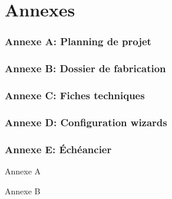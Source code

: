 \section*{Annexes}

\subsubsection*{Annexe A: Planning de projet}

\subsubsection*{Annexe B: Dossier de fabrication}

\subsubsection*{Annexe C: Fiches techniques}

\subsubsection*{Annexe D: Configuration wizards}

\subsubsection*{Annexe E: Échéancier}

\iftrue

    \clearpage
    \vspace*{\fill}
    \begin{center}
        \begin{minipage}{.6\textwidth}
            \centerline{\Huge{Annexe A}}
        \end{minipage}
    \end{center}
    \vfill %
    \clearpage

    

    \clearpage
    \vspace*{\fill}
    \begin{center}
        \begin{minipage}{.6\textwidth}
            \centerline{\Huge{Annexe B}}
        \end{minipage}
    \end{center}
    \vfill %
    \clearpage

